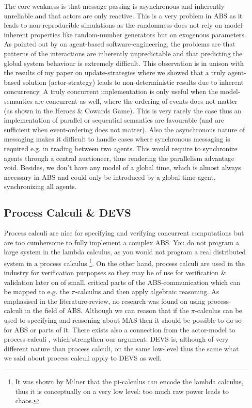 The core weakness is that message passing is asynchronous and inherently unreliable and that actors are only reactive. This is a very problem in ABS as it leads to non-reproducible simulations as the randomness does not rely on model-inherent properties like random-number generators but on exogenous parameters. As pointed out by \cite{jennings_agent-based_2000} on agent-based software-engineering, the problems are that patterns of the interactions are inherently unpredictable and that predicting the global system behaviour is extremely difficult. This observation is in unison with the results of my paper on update-strategies where we showed that a truly agent-based solution (actor-strategy) leads to non-deterministic results due to inherent concurrency. A truly concurrent implementation is only useful when the model-semantics are concurrent as well, where the ordering of events does not matter (as shown in the Heroes \& Cowards Game). This is very rarely the case thus an implementation of parallel or sequential semantics are favourable (and are sufficient when event-ordering does not matter).
Also the asynchronous nature of messaging makes it difficult to handle cases where synchronous messaging is required e.g. in trading between two agents. This would require to synchronize agents through a central auctioneer, thus rendering the parallelism advantage void. Besides, we don't have any model of a global time, which is almost always necessary in ABS and could only be introduced by a global time-agent, synchronizing all agents.

\subsection{Process Calculi \& DEVS}
Process calculi are nice for specifying and verifying concurrent computations but are too cumbersome to fully implement a complex ABS. You do not program a large system in the lambda calculus, as you would not program a real distributed system in a process calculus \footnote{It was shown by Milner \cite{milner_functions_1992} that the pi-calculus can encode the lambda calculus, thus it is conceptually on a very low level: too much raw power leads to chaos.}. On the other hand, process calculi are used in the industry for verification purpopses so they may be of use for verification \& validation later on of small, critical parts of the ABS-communication which can be mapped to e.g. the $\pi$-calculus and then apply algebraic reasoning. As emphasised in the literature-review, no research was found on using process-calculi in the field of ABS. Although we can reason that if the $\pi$-calculus can be used to specifying and reasoning about MAS then it should be possible to do so for ABS or parts of it. There exists also a connection from the actor-model to process calculi \cite{agha_foundation_1997}, which strengthen our argument. 
DEVS is, although of very different nature than process calculi, on the same low-level thus the same what we said about process calculi apply to DEVS as well.

